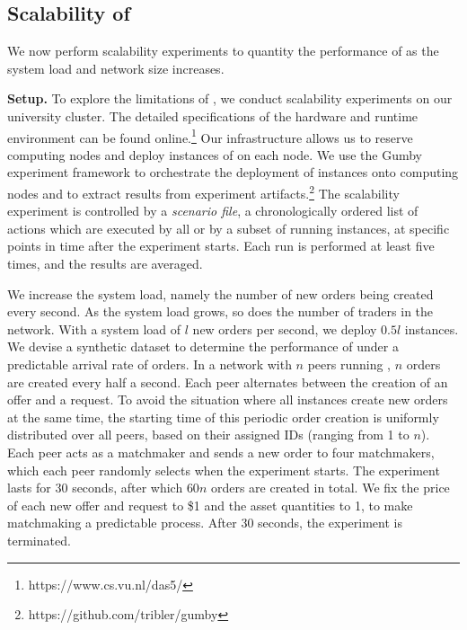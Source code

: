 \subsection{Scalability of \ModelName{}}
\label{subsec:scalability_experiment}
We now perform scalability experiments to quantity the performance of \ModelName{} as the system load and network size increases.

\textbf{Setup.}
To explore the limitations of \ModelName{}, we conduct scalability experiments on our university cluster.
The detailed specifications of the hardware and runtime environment can be found online.\footnote{https://www.cs.vu.nl/das5/}
Our infrastructure allows us to reserve computing nodes and deploy instances of \ModelName{} on each node.
We use the Gumby experiment framework to orchestrate the deployment of \ModelName{} instances onto computing nodes and to extract results from experiment artifacts.\footnote{https://github.com/tribler/gumby}
The scalability experiment is controlled by a \emph{scenario file}, a chronologically ordered list of actions which are executed by all or by a subset of running instances, at specific points in time after the experiment starts.
Each run is performed at least five times, and the results are averaged.

We increase the system load, namely the number of new orders being created every second.
As the system load grows, so does the number of traders in the network.
With a system load of $ l $ new orders per second, we deploy $ 0.5l $ \ModelName{} instances.
We devise a synthetic dataset to determine the performance of \ModelName{} under a predictable arrival rate of orders.
In a network with $ n $ peers running \ModelName{}, $ n $ orders are created every half a second.
Each peer alternates between the creation of an offer and a request.
To avoid the situation where all instances create new orders at the same time, the starting time of this periodic order creation is uniformly distributed over all peers, based on their assigned IDs (ranging from 1 to $ n $).
Each peer acts as a matchmaker and sends a new order to four matchmakers, which each peer randomly selects when the experiment starts.
The experiment lasts for 30 seconds, after which $ 60n $ orders are created in total.
We fix the price of each new offer and request to \$1 and the asset quantities to 1, to make matchmaking a predictable process.
After 30 seconds, the experiment is terminated.

